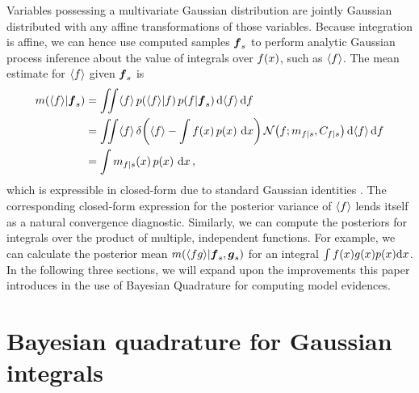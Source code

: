 \documentclass[twoside]{article}
\begin{document}
Variables possessing a multivariate Gaussian distribution are jointly Gaussian distributed with any affine transformations of those variables. Because integration is affine, we can hence use computed samples $\boldsymbol{f}_s$ to perform analytic Gaussian process inference about the value of integrals over $f(x)$, such as $\langle f \rangle$. The mean estimate for $\langle f \rangle$ given $\boldsymbol{f}_s$ is
%
\begin{align} \label{eq:mean_dnty_f}
{m}\!\left(\langle f \rangle\middle\vert\boldsymbol{f}_s\right)
& 
=\iint \langle f \rangle\,p\!\left(\langle f \rangle\middle\vert f\right)p\!\left(f\middle\vert\boldsymbol{f}_s\right) \mathrm{d} \langle f \rangle \,\mathrm{d} f                                                                                                                                                               \nonumber\\
&
 =\iint \langle f \rangle\,\delta\!\left(\langle f \rangle-\int f(x)\,p\!\left(x\right)\,\mathrm{d}x\right)
\mathcal{N}\!\left(f;{m}_{f|s},C_{f|s}\right) \mathrm{d} \langle f \rangle \,\mathrm{d} f \nonumber\\
&
 = \int {m}_{f|s}(x)\,p\!\left(x\right)\,\mathrm{d}x
\,,
\end{align}
which is expressible in closed-form due to standard Gaussian identities \cite{BZMonteCarlo}.
%
The corresponding closed-form expression for the posterior variance of $\langle f \rangle$ lends itself as a natural convergence diagnostic. Similarly, we can compute the posteriors for integrals over the product of multiple, independent functions. For example, we can calculate the posterior mean 
${m}\!\left(\langle f g \rangle\middle\vert\boldsymbol{f}_s, \boldsymbol{g}_s\right)$ for an integral $\int f(x) g(x) p(x) \mathrm{d} x$. 
 In the following three sections, we will expand upon the improvements this paper introduces in the use of Bayesian Quadrature for computing model evidences.

\section{Bayesian quadrature for Gaussian integrals}
\end{document}
